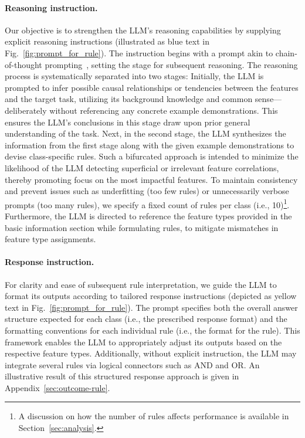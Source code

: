 \paragraph{Reasoning instruction.} Our objective is to strengthen the LLM's reasoning capabilities by supplying explicit reasoning instructions (illustrated as blue text in Fig.~\ref{fig:prompt_for_rule}). The instruction begins with a prompt akin to chain-of-thought prompting~\cite{wei2022chain}, setting the stage for subsequent reasoning. The reasoning process is systematically separated into two stages: Initially, the LLM is prompted to infer possible causal relationships or tendencies between the features and the target task, utilizing its background knowledge and common sense—deliberately without referencing any concrete example demonstrations. This ensures the LLM's conclusions in this stage draw upon prior general understanding of the task. Next, in the second stage, the LLM synthesizes the information from the first stage along with the given example demonstrations to devise class-specific rules. Such a bifurcated approach is intended to minimize the likelihood of the LLM detecting superficial or irrelevant feature correlations, thereby promoting focus on the most impactful features. To maintain consistency and prevent issues such as underfitting (too few rules) or unnecessarily verbose prompts (too many rules), we specify a fixed count of rules per class (i.e., 10)\footnote{A discussion on how the number of rules affects performance is available in Section~\ref{sec:analysis}.}. Furthermore, the LLM is directed to reference the feature types provided in the basic information section while formulating rules, to mitigate mismatches in feature type assignments.

\vspace*{-0.12in}
\paragraph{Response instruction.} For clarity and ease of subsequent rule interpretation, we guide the LLM to format its outputs according to tailored response instructions (depicted as yellow text in Fig.~\ref{fig:prompt_for_rule}). The prompt specifies both the overall answer structure expected for each class (i.e., the prescribed response format) and the formatting conventions for each individual rule (i.e., the format for the rule). This framework enables the LLM to appropriately adjust its outputs based on the respective feature types. Additionally, without explicit instruction, the LLM may integrate several rules via logical connectors such as AND and OR. An illustrative result of this structured response approach is given in Appendix~\ref{sec:outcome-rule}.

